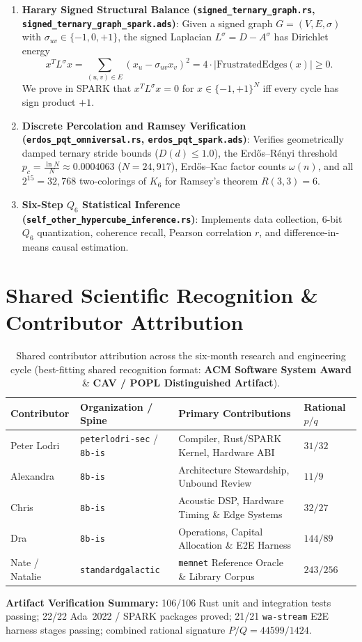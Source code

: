 \documentclass[11pt,a4paper]{article}
\begin{document}
\begin{enumerate}
  \item \textbf{Harary Signed Structural Balance (\texttt{signed\_ternary\_graph.rs}, \texttt{signed\_ternary\_graph\_spark.ads})}: Given a signed graph $G = (V, E, \sigma)$ with $\sigma_{uv} \in \{-1, 0, +1\}$, the signed Laplacian $L^\sigma = D - A^\sigma$ has Dirichlet energy
  \[
    x^T L^\sigma x = \sum_{(u,v) \in E} (x_u - \sigma_{uv} x_v)^2 = 4 \cdot |\mathrm{FrustratedEdges}(x)| \ge 0.
  \]
  We prove in SPARK that $x^T L^\sigma x = 0$ for $x \in \{-1, +1\}^N$ iff every cycle has sign product $+1$.
  \item \textbf{Discrete Percolation and Ramsey Verification (\texttt{erdos\_pqt\_omniversal.rs}, \texttt{erdos\_pqt\_spark.ads})}: Verifies geometrically damped ternary stride bounds ($D(d) \le 1.0$), the Erd\H{o}s--R\'enyi threshold $p_c = \frac{\ln N}{N} \approx 0.0004063$ ($N = 24{,}917$), Erd\H{o}s--Kac factor counts $\omega(n)$, and all $2^{15} = 32{,}768$ two-colorings of $K_6$ for Ramsey's theorem $R(3,3)=6$.
  \item \textbf{Six-Step $Q_6$ Statistical Inference (\texttt{self\_other\_hypercube\_inference.rs})}: Implements data collection, 6-bit $Q_6$ quantization, coherence recall, Pearson correlation $r$, and difference-in-means causal estimation.
\end{enumerate}

\section{Shared Scientific Recognition \& Contributor Attribution}

\begin{table}[h]
\centering
\begin{tabular}{llll}
\toprule
\textbf{Contributor} & \textbf{Organization / Spine} & \textbf{Primary Contributions} & \textbf{Rational $p/q$} \\
\midrule
Peter Lodri & \texttt{peterlodri-sec} / \texttt{8b-is} & Compiler, Rust/SPARK Kernel, Hardware ABI & $31/32$ \\
Alexandra & \texttt{8b-is} & Architecture Stewardship, Unbound Review & $11/9$ \\
Chris & \texttt{8b-is} & Acoustic DSP, Hardware Timing \& Edge Systems & $32/27$ \\
Dra & \texttt{8b-is} & Operations, Capital Allocation \& E2E Harness & $144/89$ \\
Nate / Natalie & \texttt{standardgalactic} & \texttt{memnet} Reference Oracle \& Library Corpus & $243/256$ \\
\bottomrule
\end{tabular}
\caption{Shared contributor attribution across the six-month research and engineering cycle (best-fitting shared recognition format: \textbf{ACM Software System Award} \& \textbf{CAV / POPL Distinguished Artifact}).}
\end{table}

\noindent\textbf{Artifact Verification Summary:} 106/106 Rust unit and integration tests passing; 22/22 Ada~2022 / SPARK packages proved; 21/21 \texttt{wa-stream} E2E harness stages passing; combined rational signature $P/Q = 44599/1424$.
\end{document}
